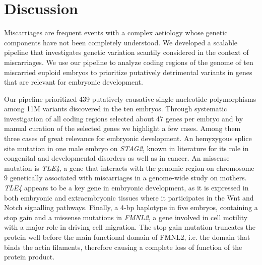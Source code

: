 \section*{Discussion}


Miscarriages are frequent events with a complex aetiology whose genetic components have not been completely understood. We developed a scalable pipeline that investigates genetic variation scantily considered in the context of miscarriages. We use our pipeline to analyze coding regions of the genome of ten miscarried euploid embryos to prioritize putatively detrimental variants in genes that are relevant for embryonic development. 

Our pipeline prioritized 439 putatively causative single nucleotide polymorphisms among 11M variants discovered in the ten embryos. Through systematic investigation of all coding regions \gp selected about 47 genes per embryo and by manual curation of the selected genes we highlight a few cases. Among them three cases of great relevance for embryonic development. An hemyzygous splice site mutation in one male embryo on \textit{STAG2}, known in literature for its role in congenital and developmental disorders as well as in cancer. An missense mutation is \textit{TLE4}, a gene that interacts with the genomic region on chromosome 9 genetically associated with miscarriages in a genome-wide study on mothers. \textit{TLE4} appears to be a key gene in embryonic development, as it is expressed in both embryonic and extraembryonic tissues where it participates in the Wnt and Notch signalling pathways. Finally, a 4-bp haplotype in five embryos, containing a stop gain and a missense mutations in \textit{FMNL2}, a gene involved in cell motility with a major role in driving cell migration. The stop gain mutation truncates the protein well before the main functional domain of FMNL2, i.e. the domain that binds the actin filaments, therefore causing a complete loss of function  of the protein product.    

